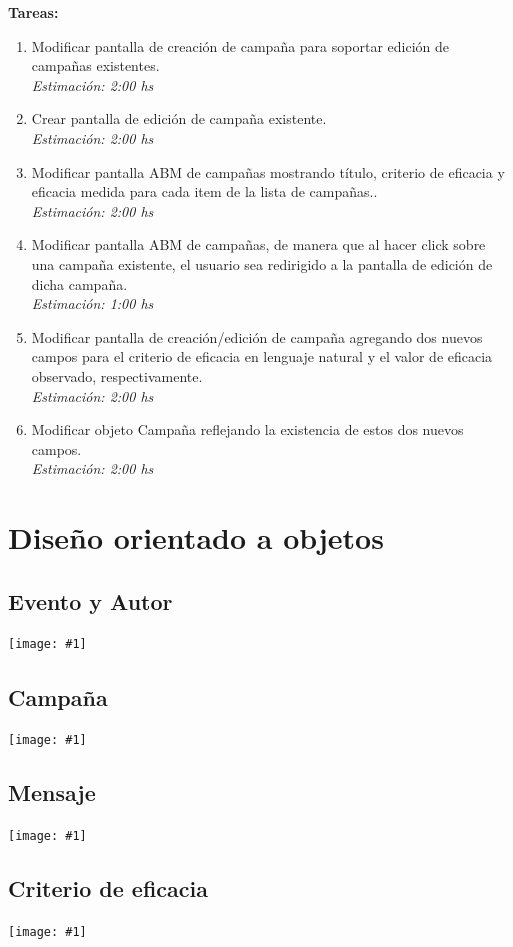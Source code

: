 \documentclass[a4paper, 10pt, twoside]{article}
\newcommand{\grafico}[1]{
  \begin{center}
    \texttt{[image: \#1]}
  \end{center}
}
\newenvironment{tasks}{
  \textbf{Tareas:}
  \begin{enumerate}
}{
  \end{enumerate}
}
\newcommand{\task}[2] {
  \item #1.\\
  \emph{Estimación: #2 hs}
}
\begin{document}
\begin{tasks}
  \task{Modificar pantalla de creación de campaña para soportar edición de campañas existentes}{2:00}
  \task{Crear pantalla de edición de campaña existente}{2:00}
  \task{Modificar pantalla ABM de campañas mostrando título, criterio de eficacia y eficacia medida para cada item de la lista de campañas.}{2:00}
  \task{Modificar pantalla ABM de campañas, de manera que al hacer click sobre una campaña existente, el usuario sea redirigido a la pantalla de edición de dicha campaña}{1:00}
  \task{Modificar pantalla de creación/edición de campaña agregando dos nuevos campos para el criterio de eficacia en lenguaje natural y el valor de eficacia observado, respectivamente}{2:00}
  \task{Modificar objeto Campaña reflejando la existencia de estos dos nuevos campos}{2:00}
\end{tasks}




\newpage
\section{Diseño orientado a objetos}


\subsection{Evento y Autor}

\grafico{diagramas/evento.png}


\subsection{Campaña}

\grafico{diagramas/campania.png}


\subsection{Mensaje}

\grafico{diagramas/mensaje.png}


\subsection{Criterio de eficacia}

\grafico{diagramas/criterio-de-eficacia.png}
\end{document}
